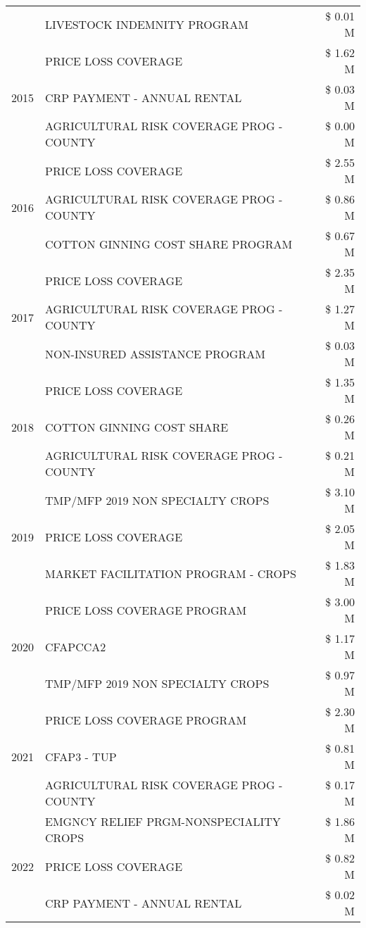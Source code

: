 \begin{tabular}{llr}
 & LIVESTOCK INDEMNITY PROGRAM & \$ 0.01 M \\
\cline{1-3}
\multirow[t]{3}{*}{2015} & PRICE LOSS COVERAGE & \$ 1.62 M \\
 & CRP PAYMENT - ANNUAL RENTAL & \$ 0.03 M \\
 & AGRICULTURAL RISK COVERAGE PROG - COUNTY & \$ 0.00 M \\
\cline{1-3}
\multirow[t]{3}{*}{2016} & PRICE LOSS COVERAGE & \$ 2.55 M \\
 & AGRICULTURAL RISK COVERAGE PROG - COUNTY & \$ 0.86 M \\
 & COTTON GINNING COST SHARE PROGRAM & \$ 0.67 M \\
\cline{1-3}
\multirow[t]{3}{*}{2017} & PRICE LOSS COVERAGE & \$ 2.35 M \\
 & AGRICULTURAL RISK COVERAGE PROG - COUNTY & \$ 1.27 M \\
 & NON-INSURED ASSISTANCE PROGRAM & \$ 0.03 M \\
\cline{1-3}
\multirow[t]{3}{*}{2018} & PRICE LOSS COVERAGE & \$ 1.35 M \\
 & COTTON GINNING COST SHARE & \$ 0.26 M \\
 & AGRICULTURAL RISK COVERAGE PROG - COUNTY & \$ 0.21 M \\
\cline{1-3}
\multirow[t]{3}{*}{2019} & TMP/MFP 2019 NON SPECIALTY CROPS & \$ 3.10 M \\
 & PRICE LOSS COVERAGE & \$ 2.05 M \\
 & MARKET FACILITATION PROGRAM - CROPS & \$ 1.83 M \\
\cline{1-3}
\multirow[t]{3}{*}{2020} & PRICE LOSS COVERAGE PROGRAM & \$ 3.00 M \\
 & CFAPCCA2 & \$ 1.17 M \\
 & TMP/MFP 2019 NON SPECIALTY CROPS & \$ 0.97 M \\
\cline{1-3}
\multirow[t]{3}{*}{2021} & PRICE LOSS COVERAGE PROGRAM & \$ 2.30 M \\
 & CFAP3 - TUP & \$ 0.81 M \\
 & AGRICULTURAL RISK COVERAGE PROG - COUNTY & \$ 0.17 M \\
\cline{1-3}
\multirow[t]{3}{*}{2022} & EMGNCY RELIEF PRGM-NONSPECIALITY CROPS & \$ 1.86 M \\
 & PRICE LOSS COVERAGE & \$ 0.82 M \\
 & CRP PAYMENT - ANNUAL RENTAL & \$ 0.02 M \\
\cline{1-3}
\bottomrule
\end{tabular}
